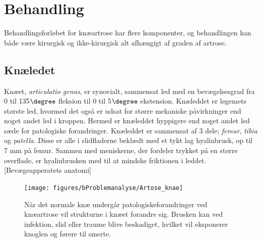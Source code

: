 \section{Behandling}
Behandlingsforløbet for knæartrose har flere komponenter, og behandlingen kan både  være kirurgisk og ikke-kirurgisk alt afhængigt af graden af artrose.
\subsection*{Knæledet}
Knæet, \textit{articulatio genus}, er synovialt, sammensat led med en bevægelsesgrad fra 0 til 135$\degree$ fleksion til 0 til 5$\degree$ ekstension. Knæleddet er legemets største led, hvormed det også er udsat for større mekaniske påvirkninger end noget andet led i kroppen. Hermed er knæleddet hyppigere end noget andet led sæde for patologiske forandringer. Knæleddet er sammensat af 3 dele; \textit{femur}, \textit{tibia} og \textit{patella}. Disse er alle i slidfladerne beklædt med et tykt lag hyalinbrusk, op til 7 mm på femur. Sammen med meniskerne, der fordeler trykket på en større overflade, er hyalinbrusken med til at mindske friktionen i leddet. [Bevægeapperatets anatomi]

\begin{figure}[H] 
\begin{center}
\texttt{[image: figures/bProblemanalyse/Artose\_knae]}
\end{center}
\caption{Når det normale knæ undergår patologiskeforandringer ved knæartrose vil strukturne i knæet forandre sig. Brusken kan ved infektion, slid eller traume blive beskadiget, hvilket vil eksponerer knoglen og førere til smerte.\citep{schroder} \citep{adobe}} 
\label{fig:tka_implant} 
\end{figure}

